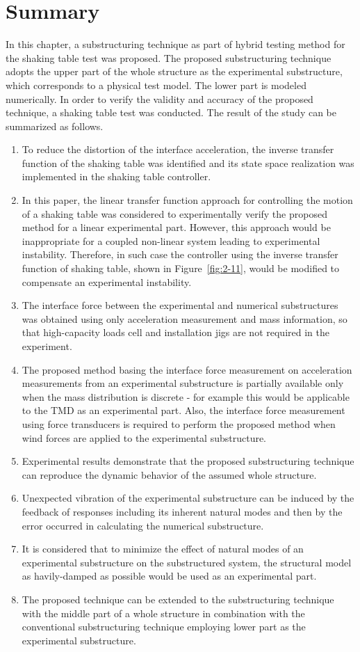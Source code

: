 \section{Summary}
In this chapter, a substructuring technique as part of hybrid testing method for the shaking table test was proposed. The proposed substructuring technique adopts the upper part of the whole structure as the experimental substructure, which corresponds to a physical test model. The lower part is modeled numerically. In order to verify the validity and accuracy of the proposed technique, a shaking table test was conducted. The result of the study can be summarized as follows.
\begin{enumerate}
\item To reduce the distortion of the interface acceleration, the inverse transfer function of the shaking table was identified and its state space realization was implemented in the shaking table controller.
\item In this paper, the linear transfer function approach for controlling the motion of a shaking table was considered to experimentally verify the proposed method for a linear experimental part. However, this approach would be inappropriate for a coupled non-linear system leading to experimental instability. Therefore, in such case the controller using the inverse transfer function of shaking table, shown in Figure~\ref{fig:2-11}, would be modified to compensate an experimental instability.
\item The interface force between the experimental and numerical substructures was obtained using only acceleration measurement and mass information, so that high-capacity loads cell and installation jigs are not required in the experiment. 
\item The proposed method basing the interface force measurement on acceleration measurements from an experimental substructure is partially available only when the mass distribution is discrete - for example this would be applicable to the TMD as an experimental part. Also, the interface force measurement using force transducers is required to perform the proposed method when wind forces are applied to the experimental substructure.
\item Experimental results demonstrate that the proposed substructuring technique can reproduce the dynamic behavior of the assumed whole structure.
\item Unexpected vibration of the experimental substructure can be induced by the feedback of responses including its inherent natural modes and then by the error occurred in calculating the numerical substructure.
\item It is considered that to minimize the effect of natural modes of an experimental substructure on the substructured system, the structural model as havily-damped as possible would be used as an experimental part.
\item The proposed technique can be extended to the substructuring technique with the middle part of a whole structure in combination with the conventional substructuring technique employing lower part as the experimental substructure.
\end{enumerate}



